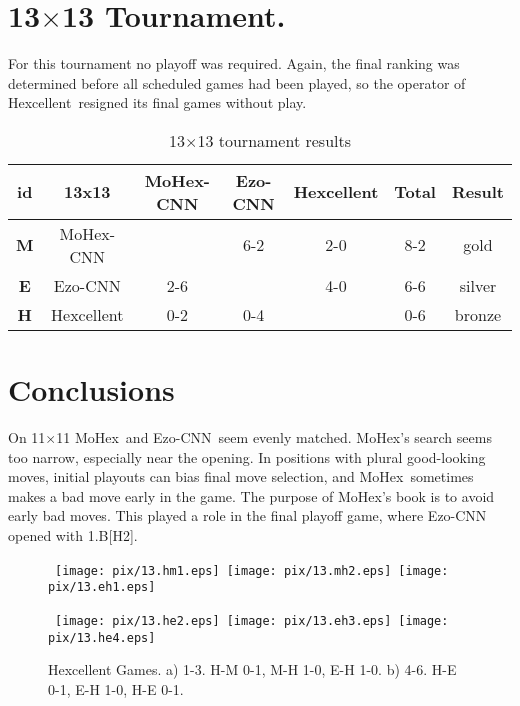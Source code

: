 \documentclass{IOS-Book-Article}
\def\Ec{\mbox{\sc Ezo-CNN}}
\def\Hent{\mbox{\sc Hexcellent}}
\def\Mx{\mbox{\sc MoHex}}
\def\Mc{\mbox{\sc MoHex-CNN}}
\begin{document}
\section{13$\times$13 Tournament.}
For this tournament no playoff was required.
Again, the final ranking was determined before
all scheduled games had been played,
so the operator of \Hent\ resigned its final games
without play.

\begin{table}
\begin{tabular}{|c|c|c|c|c|c|c|}
\hline {\bf id} & {\bf 13x13} &\Mc{} &\Ec{}  &\Hent{} 
                & {\bf Total} & {\bf Result} \\ 
\hline {\bf M} & \Mc{}         &      &  6-2  & 2-0  & 8-2   & gold \\
\hline {\bf E} & \Ec{}         &  2-6 &       & 4-0  & 6-6   & silver \\
\hline {\bf H} & \Hent{}       &  0-2 &  0-4  &      & 0-6   & bronze \\
\hline
\end{tabular}
\caption{13$\times$13 tournament results}
\label{tab:tour2}
\end{table}

\section{Conclusions}
On 11$\times$11 \Mx\ and \Ec\ seem evenly matched.
\Mx{}'s search seems too narrow, especially near the opening.
In positions with plural good-looking moves,
initial playouts can bias final move selection, and
\Mx\ sometimes makes a bad move early in the game.
The purpose of \Mx's book is to avoid early bad moves.
This played a role in the final playoff game, 
where \Ec{} opened with 1.B[H2].  

\begin{figure}
\noindent\hspace*{-2cm}\
\texttt{[image: pix/13.hm1.eps]}\hspace*{-1.8cm}\
\texttt{[image: pix/13.mh2.eps]}\hspace*{-1.8cm}\
\texttt{[image: pix/13.eh1.eps]}
\smallskip

\noindent\hspace*{-2cm}\
\texttt{[image: pix/13.he2.eps]}\hspace*{-1.8cm}\
\texttt{[image: pix/13.eh3.eps]}\hspace*{-1.8cm}\
\texttt{[image: pix/13.he4.eps]}
\caption{\Hent{} Games.  a) 1-3. H-M 0-1, M-H 1-0, E-H 1-0.
b) 4-6. H-E 0-1, E-H 1-0, H-E 0-1.}
\end{figure}
\end{document}
